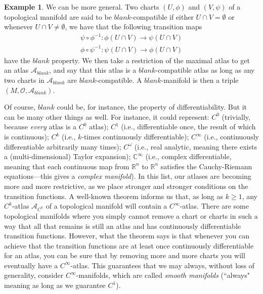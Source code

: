 \documentclass[a4paper]{book}
\theoremstyle{definition}
\newtheorem{example}{Example}[section]
\theoremstyle{definition}
\theoremstyle{definition}
\theoremstyle{theorem}
\theoremstyle{definition}
\begin{document}
\begin{example}
	We can be more general. Two charts $(U, \phi)$ and $(V, \psi)$ of a topological manifold are said to be $blank$-compatible if either $U \cap V = \emptyset$ or whenever $U \cap V \neq \emptyset$, we have that the following transition maps 
	\begin{align*}
	\psi \circ \phi^{-1}: \phi(U \cap V) \rightarrow \psi(U \cap V) \\ 
	\phi \circ \psi^{-1}: \psi(U \cap V) \rightarrow \phi(U \cap V) 
	\end{align*} 
	have the $blank$ property. We then take a restriction of the maximal atlas to get an atlas $\mathscr{A}_{blank}$, and say that this atlas is a $blank$-compatible atlas as long as any two charts in $\mathscr{A}_{blank}$ are $blank$-compatible. A $blank$-manifold is then a triple $(M, \mathscr{O}, \mathscr{A}_{blank})$.\par 
	Of course, $blank$ could be, for instance, the property of differentiability. But it can be many other things as well. For instance, it could represent: $C^0$ (trivially, because \textit{every} atlas is a $C^0$ atlas); $C^1$ (i.e., differentiable once, the result of which is continuous); $C^k$ (i.e., $k$-times continuously differentiable); $C^{\infty}$ (i.e., continuously differentiable arbitrarily many times); $C^{\omega}$ (i.e., real analytic, meaning there exists a (multi-dimensional) Taylor expansion); $\mathbb{C}^{\infty}$ (i.e., complex differentiable, meaning that each continuous map from $\mathbb{R}^n$ to $\mathbb{R}^n$ satisfies the Cauchy-Riemann equations---this gives a \textit{complex manifold}). In this list, our atlases are becoming more and more restrictive, as we place stronger and stronger conditions on the transition functions. A well-known theorem informs us that, as long as $k \geq 1$, any $C^k$-atlas $\mathscr{A}_{C^{k}}$ of a topological manifold will contain a $C^{\infty}$-atlas. There are some topological manifolds where you simply cannot remove a chart or charts in such a way that all that remains is still an atlas and has continuously differentiable transition functions. However, what the theorem says is that whenever you can achieve that the transition functions are at least once continuously differentiable for an atlas, you can be sure that by removing more and more charts you will eventually have a $C^{\infty}$-atlas. This guarantees that we may always, without loss of generality, consider $C^{\infty}$-manifolds, which are called \textit{smooth manifolds} (``always" meaning as long as we guarantee $C^1$).\par 

\end{example}
\end{document}
